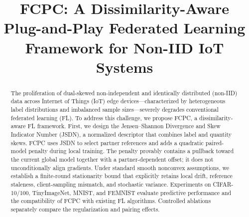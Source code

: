 \documentclass[journal,twoside,web]{ieeecolor}
\begin{document}
\title{FCPC: A Dissimilarity-Aware Plug-and-Play Federated Learning Framework for Non-IID IoT Systems}



\maketitle


\begin{abstract}
The proliferation of dual-skewed non-independent and identically distributed (non-IID) data across Internet of Things (IoT) edge devices---characterized by heterogeneous label distributions and imbalanced sample sizes---severely degrades conventional federated learning (FL). To address this challenge, we propose FCPC, a dissimilarity-aware FL framework. First, we design the Jensen--Shannon Divergence and Skew Indicator Number (JSDN), a normalized descriptor that combines label and quantity skews. FCPC uses JSDN to select partner references and adds a quadratic paired-model penalty during local training. The penalty provably contains a pullback toward the current global model together with a partner-dependent offset; it does not unconditionally align gradients. Under standard smooth nonconvex assumptions, we establish a finite-round stationarity bound that explicitly retains local drift, reference staleness, client-sampling mismatch, and stochastic variance. Experiments on CIFAR-10/100, TinyImageNet, MNIST, and FEMNIST evaluate predictive performance and the compatibility of FCPC with existing FL algorithms. Controlled ablations separately compare the regularization and pairing effects.

\end{abstract}
\end{document}
